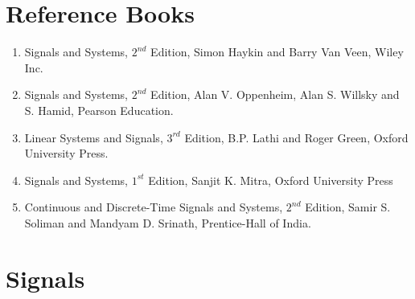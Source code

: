\documentclass[a5paper,10pt]{report}
\begin{document}
\chapter*{Reference Books}
\vspace*{-2.7cm}
\thispagestyle{empty}
\begin{enumerate}
    \item Signals and Systems, $2^{nd}$ Edition, Simon Haykin and Barry Van Veen, Wiley Inc.
    \item Signals and Systems, $2^{nd}$ Edition, Alan V. Oppenheim, Alan S. Willsky and S. Hamid, Pearson Education.
    \item Linear Systems and Signals, $3^{rd}$ Edition, B.P. Lathi and Roger Green, Oxford University Press.
    \item Signals and Systems, $1^{st}$ Edition, Sanjit K. Mitra, Oxford University Press
    \item Continuous and Discrete-Time Signals and Systems, $2^{nd}$ Edition, Samir S. Soliman and Mandyam D. Srinath, Prentice-Hall of India.
\end{enumerate}
\tableofcontents 
\thispagestyle{empty}
\newpage
\setcounter{page}{1}
\chapter{Signals}
\end{document}
